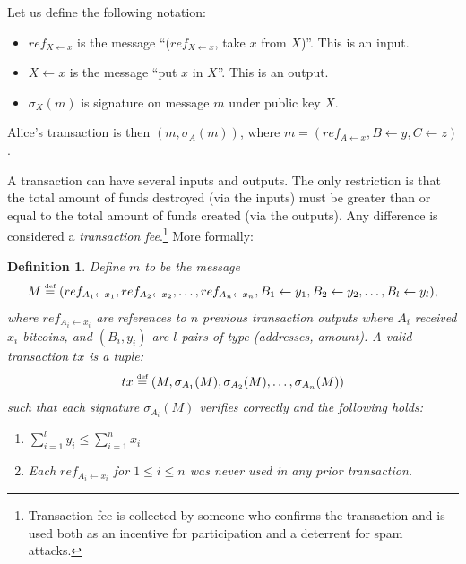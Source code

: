 \documentclass[]{report}   %
\newtheorem{definition}{Definition}
\newcommand{\sr}{\stackrel}
\newcommand{\ra}{\rightarrow}
\newcommand{\la}{\leftarrow}
\newcommand{\defined}{\stackrel{\mbox{\tiny{def}}}{=}}
\newcommand{\lea}{\leftarrow}
\begin{document}
Let us define the following notation:
\begin{itemize}
	\item $ref_{X \leftarrow x}$ is the message ``($ref_{X \leftarrow x}$, take $x$ from $X$)''. This is an input.
\item
$X \leftarrow x$ is the message ``put $x$ in $X$''. This is an output.
\item
$\sigma_X(m)$ is signature on message $m$ under public key $X$. %
\end{itemize}
Alice's transaction is then $(m, \sigma_A(m))$, where $m  =  (ref_{A \leftarrow x}, B \lea y, C \lea z)$. 

 
 
A transaction can have several inputs and outputs. The only restriction is that the total amount of funds destroyed (via the inputs) must be greater than or equal to the total amount of funds created (via the outputs). Any difference is considered a {\em transaction fee}.\footnote{Transaction fee is collected by someone who confirms the transaction and is used both as an incentive for participation and a deterrent for spam attacks.} More formally:

\begin{definition}
Define $m$ to be the message
\[
M \defined (ref_{A_1\leftarrow x_1}, ref_{A_2\leftarrow x_2}, \ldots, ref_{A_n\leftarrow x_n}, B_1\la y_1,
B_2\la y_2, \ldots, B_l\la y_l), 
\] 
where $ref_{A_i\leftarrow x_i}$ are references to $n$ previous transaction outputs where $A_i$ received $x_i$ bitcoins, and $(B_i, y_i)$ are $l$ pairs of type (addresses, amount). 
A valid transaction $tx$ is a tuple: 
\begin{equation}\label{tx0}tx\defined (M, \sigma_{A_1}(M), \sigma_{A_2}(M), \ldots, \sigma_{A_n}(M))\end{equation} such that each signature $\sigma_{A_i}(M)$ verifies correctly and the following holds:
\begin{enumerate}
	\item $\sum_{i=1}^{l}y_i \leq \sum_{i=1}^{n}x_i$ 
	\item Each $ref_{A_i \leftarrow x_i}$ for $1\leq i\leq n$ was never used in any prior transaction.
\end{enumerate}
\end{definition}
\end{document}
